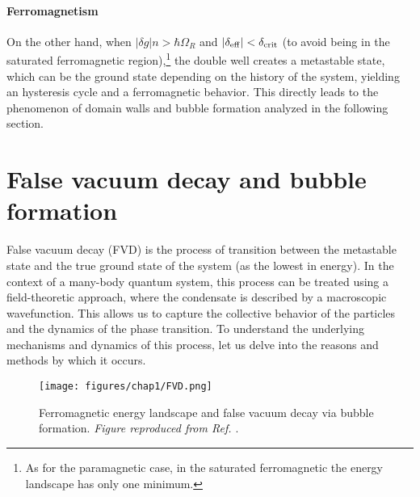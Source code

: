 \paragraph{Ferromagnetism}
On the other hand, when $|\delta g|n > \hbar\Omega_R$ and $|\delta_{\rm eff}| < \delta_{\rm crit}$ (to avoid being in the saturated ferromagnetic region),\footnote{As for the paramagnetic case, in the saturated ferromagnetic the energy landscape has only one minimum.} the double well creates a metastable state, which can be the ground state depending on the history of the system, yielding an hysteresis cycle and a ferromagnetic behavior. 
This directly leads to the phenomenon of domain walls and bubble formation analyzed in the following section.


\section{False vacuum decay and bubble formation}
False vacuum decay (FVD) is the process of transition between the metastable state and the true ground state of the system (as the lowest in energy). In the context of a many-body quantum system, this process can be treated using a field-theoretic approach, where the condensate is described by a macroscopic wavefunction. This allows us to capture the collective behavior of the particles and the dynamics of the phase transition. 
To understand the underlying mechanisms and dynamics of this process, let us delve into the reasons and methods by which it occurs.

\begin{figure}[ht!]
    \centering
    \texttt{[image: figures/chap1/FVD.png]}
    \caption{Ferromagnetic energy landscape and false vacuum decay via bubble formation. \textit{Figure reproduced from Ref. \cite{zenesini2024false}}.}
    \label{fig:FVD}
\end{figure}

